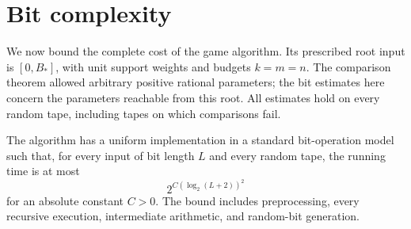 \section{Bit complexity}
\label{sec:complexity}

We now bound the complete cost of the game algorithm. Its prescribed
root input is \([0,B_*]\), with unit support weights and budgets
\(k=m=n\). The comparison theorem allowed arbitrary positive rational
parameters; the bit estimates here concern the parameters reachable
from this root. All estimates hold on every random tape, including
tapes on which comparisons fail.

\begin{theorem}\label{thm:bit-complexity}
The algorithm has a uniform implementation in a standard bit-operation
model such that, for every input of bit length \(L\) and every random
tape, the running time is at most
\[
              2^{C(\log_2(L+2))^2}
\]
for an absolute constant \(C>0\). The bound includes preprocessing,
every recursive execution, intermediate arithmetic, and random-bit
generation.
\end{theorem}

